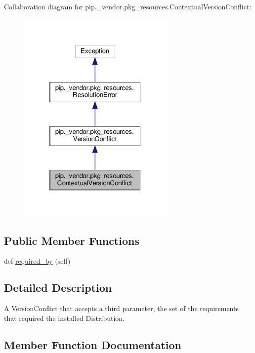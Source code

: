 Collaboration diagram for pip.\+\_\+vendor.\+pkg\+\_\+resources.\+Contextual\+Version\+Conflict\+:
\nopagebreak
\begin{figure}[H]
\begin{center}
\leavevmode
\includegraphics[width=217pt]{classpip_1_1__vendor_1_1pkg__resources_1_1ContextualVersionConflict__coll__graph}
\end{center}
\end{figure}
\subsection*{Public Member Functions}
\begin{DoxyCompactItemize}
\item 
def \hyperlink{classpip_1_1__vendor_1_1pkg__resources_1_1ContextualVersionConflict_a37f225991b84571bab3c88f01ff39ff2}{required\+\_\+by} (self)
\end{DoxyCompactItemize}


\subsection{Detailed Description}
\begin{DoxyVerb}A VersionConflict that accepts a third parameter, the set of the
requirements that required the installed Distribution.
\end{DoxyVerb}
 

\subsection{Member Function Documentation}
\mbox{\label{classpip_1_1__vendor_1_1pkg__resources_1_1ContextualVersionConflict_a37f225991b84571bab3c88f01ff39ff2}} 
